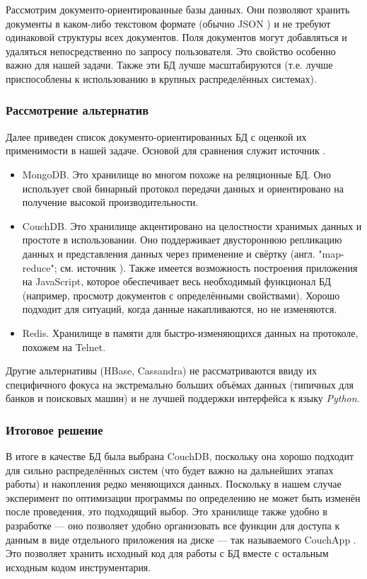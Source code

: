 Рассмотрим документо-ориентированные базы данных. Они позволяют хранить документы в каком-либо текстовом формате (обычно JSON \cite{json}) и не требуют одинаковой структуры всех документов. Поля документов могут добавляться и удаляться непосредственно по запросу пользователя. Это свойство особенно важно для нашей задачи. Также эти БД лучше масштабируются (т.е. лучше приспособлены к использованию в крупных распределённых системах).

\subsubsection{Рассмотрение альтернатив}
Далее приведен список документо-ориентированных БД с оценкой их применимости в нашей задаче. Основой для сравнения служит источник \cite{nosql-comparison}.

\begin{itemize}
    \item MongoDB. Это хранилище во многом похоже на реляционные БД. Оно использует свой бинарный протокол передачи данных и ориентировано на получение высокой производительности.
    \item CouchDB. Это хранилище акцентировано на целостности хранимых данных и простоте в использовании. Оно поддерживает двустороннюю репликацию данных и представления данных через применение и свёртку (англ. "map-reduce"; см. источник \cite{map-reduce}). Также имеется возможность построения приложения на JavaScript, которое обеспечивает весь необходимый функционал БД (например, просмотр документов с определёнными свойствами). Хорошо подходит для ситуаций, когда данные накапливаются, но не изменяются.
    \item Redis. Хранилище в памяти для быстро-изменяющихся данных на протоколе, похожем на Telnet.
\end{itemize}

Другие альтернативы (HBase, Cassandra) не рассматриваются ввиду их специфичного фокуса на экстремально больших объёмах данных (типичных для банков и поисковых машин) и не лучшей поддержки интерфейса к языку \textit{Python}.

\subsubsection{Итоговое решение}
В итоге в качестве БД была выбрана CouchDB, поскольку она хорошо подходит для сильно распределённых систем (что будет важно на дальнейших этапах работы) и накопления редко меняющихся данных. Поскольку в нашем случае эксперимент по оптимизации программы по определению не может быть изменён после проведения, это подходящий выбор.
Это хранилище также удобно в разработке --- оно позволяет удобно организовать все функции для доступа к данным в виде отдельного приложения на диске --- так называемого CouchApp \cite{couchapp}. Это позволяет хранить исходный код для работы с БД вместе с остальным исходным кодом инструментария.


